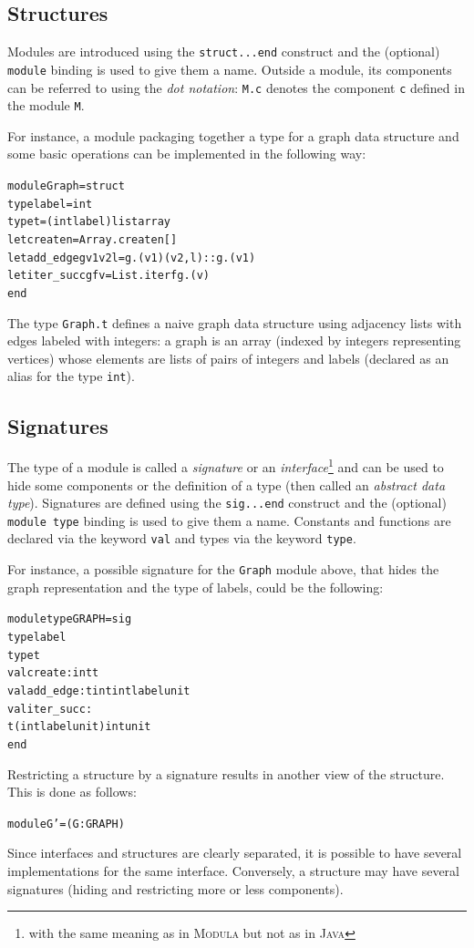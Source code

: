\subsection{Structures}

Modules are introduced using the \texttt{struct...end} construct and
the (optional) \texttt{module} binding is used to give them a name.
Outside a module, its components can be referred to using the
\emph{dot notation}: \texttt{M.c} denotes the component
\texttt{c} defined in the module \texttt{M}.

For instance, a module packaging together a type for a graph data
structure and some basic operations can be implemented in the
following way:
\begin{alltt}
module Graph = struct
  type label = int 
  type t = (int \fois label) list array
  let create n = Array.create n []
  let add_edge g v1 v2 l = g.(v1) \flg (v2,l)::g.(v1)
  let iter_succ g f v = List.iter f g.(v)
end
\end{alltt}
The type \texttt{Graph.t} defines a naive graph data structure using
adjacency lists with edges labeled with integers: a graph is an array
(indexed by integers representing vertices) whose elements are lists of
pairs of integers and labels (declared as an alias for the type
\texttt{int}). 

\subsection{Signatures}

The type of a module is called a \emph{signature} or an
\emph{interface}\footnote{with the same meaning as in \textsc{Modula}
  but not as in \textsc{Java}} and can be used to hide some components
or the definition of a type (then called an \emph{abstract data
  type}). Signatures are defined using the \texttt{sig...end}
construct and the (optional) \texttt{module type} binding is used to
give them a name. Constants and functions are declared 
via the keyword \texttt{val} and types via the keyword \texttt{type}.

For instance, a possible signature for the \texttt{Graph} module
above, that hides the graph representation and the type of labels,
could be the following:
\begin{alltt}
module type GRAPH = sig
  type label
  type t
  val create : int \fl t
  val add_edge : t \fl int \fl int \fl label \fl unit 
  val iter_succ : 
    t \fl (int \fois label \fl unit) \fl int \fl unit
end
\end{alltt}
Restricting a structure by a signature results in another view of the
structure. This is done as follows:
\begin{alltt}
module G' = (G : GRAPH)
\end{alltt}
Since interfaces and structures are clearly separated, it is possible
to have several implementations for the same interface. Conversely, a
structure may have several signatures (hiding and restricting more
or less components). 

